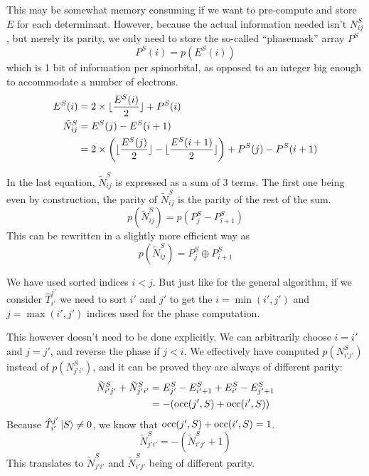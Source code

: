 \documentclass[./thesis.tex]{subfiles}
\begin{document}
This may be somewhat memory consuming if we want to pre-compute and store $E$ for each determinant. However, because the actual information needed isn't $N^S_{ij}$, but merely its parity, we only need to store the so-called ``phasemask'' array $P^S$
\begin{equation}
\label{eq:phasemask}
P^S(i) = p(E^S(i))
\end{equation}
which is 1 bit of information per spinorbital, as opposed to an integer big enough to accommodate a number of electrons.
\begin{align}
E^S(i) & = 2 \times  \lfloor \frac{E^S(i)}{2} \rfloor + P^S(i) \\
\tilde N^S_{ij} & = E^S(j) - E^S(i+1) \\
 & = 2 \times \qty( \lfloor \frac{E^S(j)}{2} \rfloor - \lfloor \frac{E^S(i+1)}{2} \rfloor ) + P^S(j) - P^S(i+1)
\end{align}
	    
In the last equation, $\tilde N^S_{ij}$ is expressed as a sum of 3 terms. The first one being even by construction, the parity of $\tilde N^S_{ij}$ is the parity of the rest of the sum.
\begin{equation}
p(\tilde N^S_{ij})=p(P^S_j - P^S_{i+1})
\end{equation}
This can be rewritten in a slightly more efficient way as
\begin{equation}
p(\tilde N^S_{ij}) = P^S_j \oplus P^S_{i+1}
\end{equation}


We have used sorted indices $i<j$. But just like for the general algorithm, if we consider $\hat T_{i'}^{j'}$ we need to sort $i'$ and $j'$ to get the $i=\min(i', j')$ and $j=\max(i', j')$ indices used for the phase computation.

This however doesn't need to be done explicitly. We can arbitrarily choose $i=i'$ and $j=j'$, and reverse the phase if $j<i$. We effectively have computed $p(N^S_{i'j'})$ instead of $p(N^S_{j'i'})$, and it can be proved they are always of different parity:
\begin{align}
\tilde N^{S}_{i' j'} + \tilde N^{S}_{j'i'} & = E^{S}_{j'} - E^S_{i'+1} + E^S_{i'} - E^S_{j'+1} \\
& = -\qty( {\text{occ}(j',S)} + {\text{occ}(i',S)})
\end{align}
Because $\hat T_{i'}^{j'} \ket S \neq 0$, we know that ${\text{occ}(j',S)} + {\text{occ}(i',S)} = 1$. 
\begin{equation}
\tilde N^{S}_{j' i'} = -(\tilde N^{S}_{i'j'} + 1)
\end{equation}
This translates to $\tilde N^{S}_{j' i'}$ and $\tilde N^{S}_{i'j'}$ being of different parity.
\end{document}
